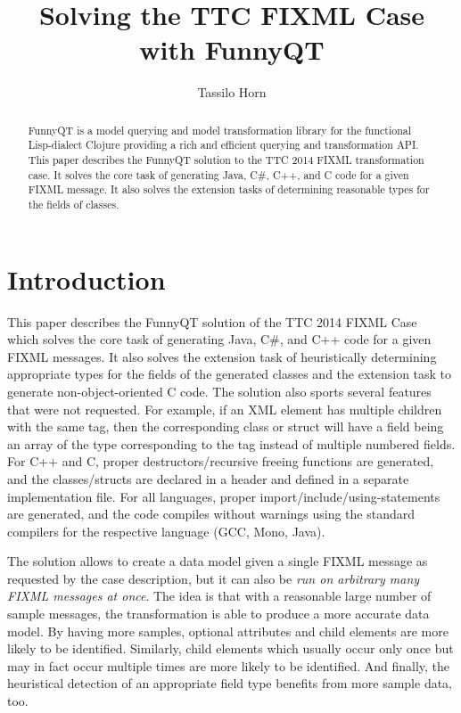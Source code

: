 \documentclass[submission]{eptcs}
\title{Solving the TTC FIXML Case with FunnyQT}
\author{Tassilo Horn
  \institute{Institute for Software Technology, University Koblenz-Landau, Germany}
  \email{horn@uni-koblenz.de}}
\begin{document}
\maketitle

\begin{abstract}
  FunnyQT is a model querying and model transformation library for the
  functional Lisp-dialect Clojure providing a rich and efficient querying and
  transformation API.  This paper describes the FunnyQT solution to the TTC
  2014 FIXML transformation case.  It solves the core task of generating Java,
  C\#, C++, and C code for a given FIXML message.  It also solves the extension
  tasks of determining reasonable types for the fields of classes.
\end{abstract}


\section{Introduction}
\label{sec:introduction}

This paper describes the FunnyQT solution of the TTC 2014 FIXML
Case~\cite{fixml-case-desc} which solves the core task of generating Java, C\#,
and C++ code for a given FIXML messages.  It also solves the extension task of
heuristically determining appropriate types for the fields of the generated
classes and the extension task to generate non-object-oriented C code.  The
solution also sports several features that were not requested.  For example, if
an XML element has multiple children with the same tag, then the corresponding
class or struct will have a field being an array of the type corresponding to
the tag instead of multiple numbered fields.  For C++ and C, proper
destructors/recursive freeing functions are generated, and the classes/structs
are declared in a header and defined in a separate implementation file.  For
all languages, proper import/include/using-statements are generated, and the
code compiles without warnings using the standard compilers for the respective
language (GCC, Mono, Java).

The solution allows to create a data model given a single FIXML message as
requested by the case description, but it can also be \emph{run on arbitrary
  many FIXML messages at once}.  The idea is that with a reasonable large
number of sample messages, the transformation is able to produce a more
accurate data model.  By having more samples, optional attributes and child
elements are more likely to be identified.  Similarly, child elements which
usually occur only once but may in fact occur multiple times are more likely to
be identified.  And finally, the heuristical detection of an appropriate field
type benefits from more sample data, too.
\end{document}
